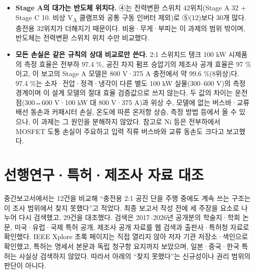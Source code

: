 \begin{itemize}
\item \textbf{Stage A의 대가는 반도체 위치다.} ④는 전력변환 스위치 42위치(Stage A 32 + Stage C 10. 비상 V\textsubscript{A} 클램프와 공통 구동 인버터 제외)로 ⑤(12)보다 30개 많다. 충전용 32위치가 더해지기 때문이다. 비용·무게·부피는 이 과제의 범위 밖이며, 반도체는 전력변환 스위치 위치 수만 비교했다.
\item \textbf{모든 손실은 같은 규칙의 상대 비교로만 쓴다.} 2:1 스위치드 탱크 100 kW 시제품의 측정 효율은 전부하 97.4 \%\cite{b3}, 공진 차지 펌프 승압기의 제조사 공개 효율은 97 \%\cite{b26}이고, 이 보고의 Stage A 모델은 800 V·375 A 충전에서 약 99.6 \%(8위상)다. 97.4 \%는 소자·전압·정격·냉각이 다른 별도 100 kW 실물(300–600 V)의 측정 경계이며 이 설계 모델의 절대 효율 검증값으로 쓰지 않는다. 두 값의 차이는 운전점(300↔600 V·100 kW 대 800 V·375 A)과 위상 수, 모델에 없는 버스바·교류 배선 동손과 커패시터 손실, 온도에 따른 온저항 상승, 측정 방법 등에서 올 수 있으나, 이 과제는 그 원인을 분해하지 않았다. 참고로 Ni 등은 전부하에서 MOSFET 도통 손실이 주요하고 입력 직류 버스바와 교류 동손도 크다고 보고했다\cite{b3}.
\end{itemize}

\section{선행연구·특허·제조사 자료 대조}

중간보고서에서는 12건을 비교해 “충전용 2:1 공진 단을 주행 중에도 계속 쓰는 구조는 이 조사 범위에서 찾지 못했다”고 적었다. 최종 보고서 작성 전에 세 주장을 요소로 나누어 다시 검색했고, 29건을 대조했다. 검색은 2017–2026년 공개분의 학술지·학회 논문, 미국·유럽·국제 특허 공개, 제조사 공개 자료를 웹 검색과 출판사·특허청 자료로 확인했다. IEEE Xplore 초록 페이지는 직접 열리지 않아 저자 기관 저장소·색인으로 확인했고, 특허는 명세서 본문과 독립 청구항 요지까지 보았으며, 일본·중국·한국 특허는 사실상 검색하지 않았다. 따라서 아래의 “찾지 못했다”는 신규성이나 권리 범위의 판단이 아니다.

